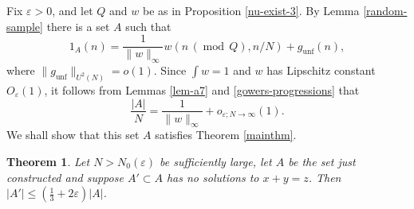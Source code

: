 \documentclass[10pt,reqno]{amsart}
\newtheorem{theorem}{Theorem}[section]
\theoremstyle{definition}
\theoremstyle{remark}
\newcommand{\md}[1]{\ensuremath{\,(\operatorname{mod}\, #1)}}
\renewcommand{\leq}{\leqslant}
\newcommand\unf{\operatorname{unf}}
\def\eps{\varepsilon}
\numberwithin{equation}{section}
\begin{document}
Fix $\eps>0$, and let $Q$ and $w$ be as in Proposition \ref{nu-exist-3}. By Lemma \ref{random-sample} there is a set $A$ such that 
\begin{equation}\label{a-prop-1} 1_A(n) = \frac{1}{\|w\|_\infty} w(n\md Q,n/N) + g_{\unf}(n),\end{equation} where $\| g_{\unf} \|_{U^2(N)} = o(1)$. Since $\int w = 1$ and $w$ has Lipschitz constant $O_{\eps}(1)$, it follows from Lemmas \ref{lem-a7} and \ref{gowers-progressions} that
\begin{equation}\label{a-prop-2} \frac{|A|}{N} = \frac{1}{\| w \|_{\infty}} + o_{\eps; N \rightarrow \infty}(1).\end{equation}
We shall show that this set $A$ satisfies Theorem \ref{mainthm}.

\begin{theorem}\label{mainthm-sec3}
Let $N>N_0(\eps)$ be sufficiently large, let $A$ be the set just constructed and suppose $A' \subset A$ has no solutions to $x + y = z$. Then $|A'| \leq (\frac{1}{3} + 2\eps)|A|$.
\end{theorem}
\end{document}
